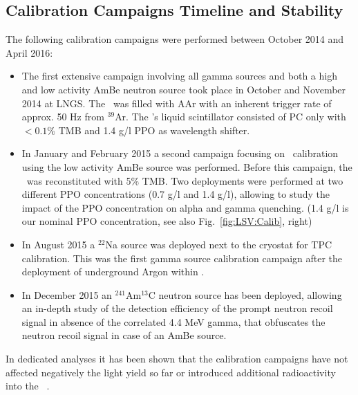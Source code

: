 \subsection{Calibration Campaigns Timeline and Stability}
The following calibration campaigns were performed between October 2014 and April 2016:
\begin{itemize}
\item The first extensive campaign involving all gamma sources and both a high and low activity AmBe neutron source took place in October and November 2014 at LNGS. The \tpc\ was filled with AAr with an inherent trigger rate of approx. 50 Hz from $^{39}$Ar. The \lsv's liquid scintillator consisted of PC only with $<0.1 \%$ TMB and 1.4 g/l PPO as wavelength shifter.

\item In January and February 2015 a second campaign focusing on \lsv\ calibration using the low activity AmBe source was performed. Before this campaign, the \lsv\ was reconstituted with 5\% TMB. Two deployments were performed at two different PPO concentrations (0.7 g/l and 1.4 g/l), allowing to study the impact of the PPO concentration on alpha and gamma quenching. (1.4 g/l is our nominal PPO concentration, see also Fig.~\ref{fig:LSV:Calib}, right)

\item In August 2015 a $^{22}$Na source was deployed next to the cryostat for TPC calibration. This was the first gamma source calibration campaign after the deployment of underground Argon within \dsf.
\item In December 2015 an $^{241}$Am$^{13}$C neutron source has been deployed, allowing an in-depth study of the detection efficiency of the prompt neutron recoil signal in absence of the correlated 4.4 MeV gamma, that obfuscates the neutron recoil signal in case of an AmBe source.
\end{itemize}

In dedicated analyses it has been shown that the calibration campaigns have not affected negatively the light yield so far or introduced additional radioactivity into the \lsv\ \cite{Agnes:2015qyz}.



